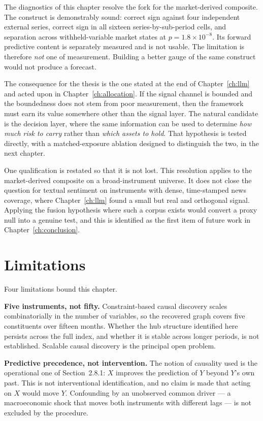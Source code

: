 The diagnostics of this chapter resolve the fork for the market-derived composite. The construct is
demonstrably sound: correct sign against four independent external series, correct sign in all
sixteen series-by-sub-period cells, and separation across withheld-variable market states at
$p = 1.8 \times 10^{-8}$. Its forward predictive content is separately measured and is not usable.
The limitation is therefore \emph{not} one of measurement. Building a better gauge of the same
construct would not produce a forecast.

The consequence for the thesis is the one stated at the end of Chapter~\ref{ch:llm} and acted upon
in Chapter~\ref{ch:allocation}. If the signal channel is bounded and the boundedness does not stem
from poor measurement, then the framework must earn its value somewhere other than the signal
layer. The natural candidate is the decision layer, where the same information can be used to
determine \emph{how much risk to carry} rather than \emph{which assets to hold}. That hypothesis is
tested directly, with a matched-exposure ablation designed to distinguish the two, in the next
chapter.

One qualification is restated so that it is not lost. This resolution applies to the
market-derived composite on a broad-instrument universe. It does not close the question for
textual sentiment on instruments with dense, time-stamped news coverage, where
Chapter~\ref{ch:llm} found a small but real and orthogonal signal. Applying the fusion hypothesis
where such a corpus exists would convert a proxy null into a genuine test, and this is identified
as the first item of future work in Chapter~\ref{ch:conclusion}.

\section{Limitations}
\label{sec:dchf-limits}

Four limitations bound this chapter.

\textbf{Five instruments, not fifty.} Constraint-based causal discovery scales combinatorially in
the number of variables, so the recovered graph covers five constituents over fifteen months.
Whether the hub structure identified here persists across the full index, and whether it is stable
across longer periods, is not established. Scalable causal discovery is the principal open problem.

\textbf{Predictive precedence, not intervention.} The notion of causality used is the operational
one of Section~2.8.1: $X$ improves the prediction of $Y$ beyond $Y$'s own past. This is not
interventional identification, and no claim is made that acting on $X$ would move $Y$. Confounding
by an unobserved common driver --- a macroeconomic shock that moves both instruments with
different lags --- is not excluded by the procedure.

